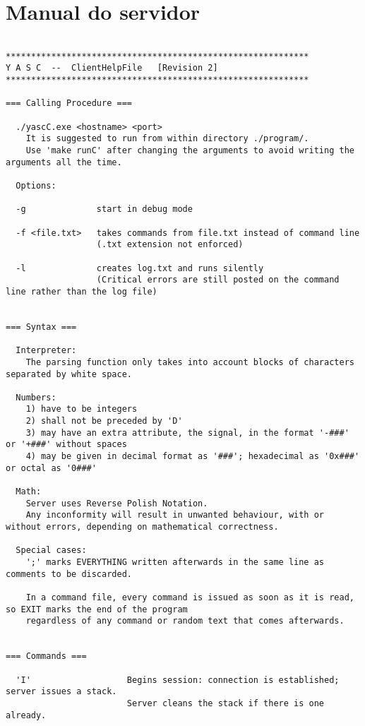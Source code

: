 \lstset{breaklines=true}	%

\section{Manual do servidor}

\begin{lstlisting}

************************************************************
Y A S C  --  ClientHelpFile   [Revision 2]
************************************************************

=== Calling Procedure ===

  ./yascC.exe <hostname> <port>
    It is suggested to run from within directory ./program/.
    Use 'make runC' after changing the arguments to avoid writing the arguments all the time.

  Options:

  -g              start in debug mode

  -f <file.txt>   takes commands from file.txt instead of command line
                  (.txt extension not enforced)

  -l              creates log.txt and runs silently
                  (Critical errors are still posted on the command line rather than the log file)


=== Syntax ===

  Interpreter:
    The parsing function only takes into account blocks of characters separated by white space.

  Numbers:
    1) have to be integers
    2) shall not be preceded by 'D'
    3) may have an extra attribute, the signal, in the format '-###' or '+###' without spaces
    4) may be given in decimal format as '###'; hexadecimal as '0x###' or octal as '0###'

  Math:
    Server uses Reverse Polish Notation.
    Any inconformity will result in unwanted behaviour, with or without errors, depending on mathematical correctness.

  Special cases:
    ';' marks EVERYTHING written afterwards in the same line as comments to be discarded.

    In a command file, every command is issued as soon as it is read, so EXIT marks the end of the program
    regardless of any command or random text that comes afterwards.


=== Commands ===

  'I'                   Begins session: connection is established; server issues a stack.
                        Server cleans the stack if there is one already.


\end{lstlisting}
